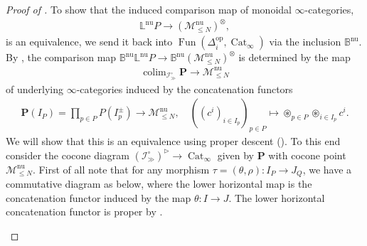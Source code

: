 \documentclass[12pt, reqno]{amsart}
\theoremstyle{plain}
\theoremstyle{definition}
\begin{document}
\begin{proof}[Proof of ]
To show that the induced comparison map of monoidal $\infty$-categories,
\begin{align*}
\mathbb{L}^{\operatorname{nu}}P\longrightarrow (\mathscr{M}_{\leq N}^{\operatorname{nu}})^\otimes,
\end{align*}
is an equivalence, we send it back into $\operatorname{Fun}(\Delta^{\operatorname{op}}_i, \operatorname{Cat}_\infty)$ via the inclusion $\mathbb{B}^{\operatorname{nu}}$. By , the comparison map $\mathbb{B}^{\operatorname{nu}}\mathbb{L}^{\operatorname{nu}}P\rightarrow \mathbb{B}^{\operatorname{nu}}(\mathscr{M}_{\leq N}^{\operatorname{nu}})^\otimes$ is determined by the map
\begin{align*}
\mathop{\operatorname{colim}}_{\mathcal{I}_\gg^\circ} \mathbf{P}\rightarrow \mathscr{M}_{\leq N}^{\operatorname{nu}}
\end{align*}
of underlying $\infty$-categories induced by the concatenation functors
\begin{align*}
\mathbf{P}(I_P)=\prod_{p\in P} P(I_p^\pm) \longrightarrow \mathscr{M}_{\leq N}^{\operatorname{nu}},\quad \left((c^i)_{i\in I_p}\right)_{p\in P}\mapsto \circledast_{p\in P}\circledast_{i \in I_p} c^i.
\end{align*}
We will show that this is an equivalence using proper descent (\cite[Theorem 2.29]{ClausenOrsnesJansen}). To this end consider the cocone diagram $(\mathcal{I}^\circ_\gg)^\triangleright\rightarrow\operatorname{Cat}_\infty$ given by $\mathbf{P}$ with cocone point $\mathscr{M}_{\leq N}^{\operatorname{nu}}$. First of all note that for any morphism $\tau=(\theta,\rho)\colon I_P\rightarrow J_Q$, we have a commutative diagram as below, where the lower horizontal map is the concatenation functor induced by the map $\theta\colon I \rightarrow J$. The lower horizontal concatenation functor is proper by .
\begin{center}
\end{center}
\end{proof}
\end{document}
